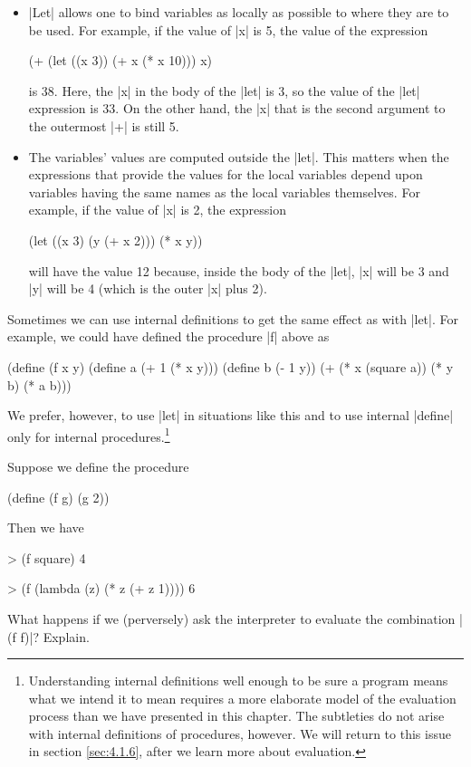 \begin{itemize}
\item \scheme|Let| allows one to
bind variables as locally as possible to where they
are to be used.  For example, if the value of \scheme|x| is 5,
the value of the expression

\begin{schemedisplay}
(+ (let ((x 3))
     (+ x (* x 10)))
   x)
\end{schemedisplay}

is 38.  Here, the \scheme|x| in the body of the \scheme|let| is 3,
so the value of the \scheme|let| expression is 33.  On the other hand, the
\scheme|x| that is the second argument to the outermost \scheme|+| is still 5.

\item The variables' values are computed outside the \scheme|let|.
This matters when the expressions that
provide the values for the local variables depend upon
variables having the same names as the local variables themselves.
For example, if the value of \scheme|x| is 2, the expression

\begin{schemedisplay}
(let ((x 3)
      (y (+ x 2)))
  (* x y))
\end{schemedisplay}
will have the value 12 because, inside the body of the \scheme|let|,
\scheme|x| will be 3 and \scheme|y| will be 4 (which is the
outer \scheme|x| plus 2).
\end{itemize}

Sometimes we can use internal definitions to get the same effect as
with \scheme|let|.  For example, we could have defined the procedure
\scheme|f| above as
\begin{schemedisplay}
(define (f x y)
  (define a (+ 1 (* x y)))
  (define b (- 1 y))
  (+ (* x (square a))
     (* y b)
     (* a b)))
\end{schemedisplay}
We prefer, however, to use \scheme|let| in situations like this and to
use internal \scheme|define| only for internal
procedures.\footnote{Understanding internal definitions well enough to
  be sure a program means what we intend it to mean requires a more
  elaborate model of the evaluation process than we have presented in
  this chapter.  The subtleties do not arise with internal definitions
  of procedures, however.  We will return to this issue in section
  \ref{sec:4.1.6}, after we learn more about evaluation.}

\begin{Exercise}
\label{exc:1.34}
Suppose we define the procedure

\begin{schemedisplay}
(define (f g)
  (g 2))
\end{schemedisplay}
Then we have

\begin{schemedisplay}
> (f square)
4

> (f (lambda (z) (* z (+ z 1))))
6
\end{schemedisplay}
What happens if we (perversely) ask the interpreter to evaluate the
combination \scheme|(f f)|?  Explain.
\end{Exercise}


